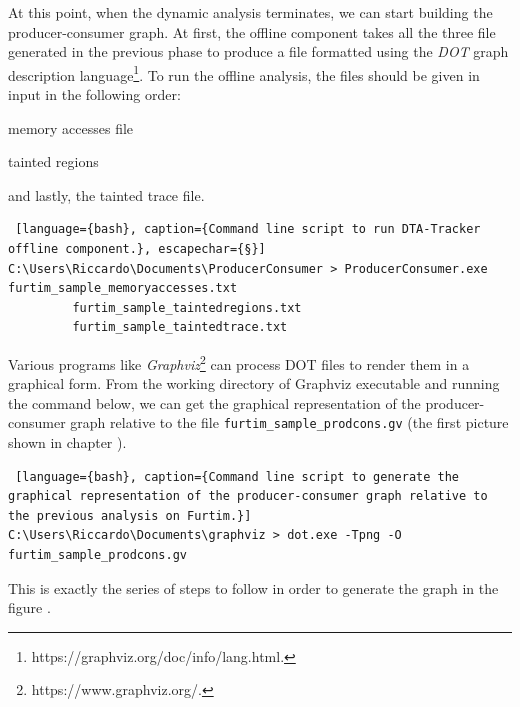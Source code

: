 \documentclass[LaM,binding=0.6cm]{sapthesis}
\begin{document}
At this point, when the dynamic analysis terminates, we can start building the producer-consumer graph. At first, the offline component takes all the three file generated in the previous phase to produce a file formatted using the \textit{DOT} graph description language\footnote{https://graphviz.org/doc/info/lang.html.}. To run the offline analysis, the files should be given in input in the following order:
\begin{enumerate*}[label=\roman*),itemjoin={,\quad}]
\item memory accesses file
\item tainted regions 
\item and lastly, the tainted trace file.\\
\end{enumerate*}
\begin{lstlisting} [language={bash}, caption={Command line script to run DTA-Tracker offline component.}, escapechar={§}]
C:\Users\Riccardo\Documents\ProducerConsumer > ProducerConsumer.exe furtim_sample_memoryaccesses.txt 
		 furtim_sample_taintedregions.txt 
		 furtim_sample_taintedtrace.txt
\end{lstlisting}
Various programs like \textit{Graphviz}\footnote{https://www.graphviz.org/.} can process DOT files to render them in a graphical form. From the working directory of Graphviz executable and running the command below, we can get the graphical representation of the producer-consumer graph relative to the file \texttt{furtim\_sample\_prodcons.gv} (the first picture shown in chapter ).
\begin{lstlisting} [language={bash}, caption={Command line script to generate the graphical representation of the producer-consumer graph relative to the previous analysis on Furtim.}]
C:\Users\Riccardo\Documents\graphviz > dot.exe -Tpng -O furtim_sample_prodcons.gv
\end{lstlisting}
This is exactly the series of steps to follow in order to generate the graph in the figure .\\ 
\end{document}
